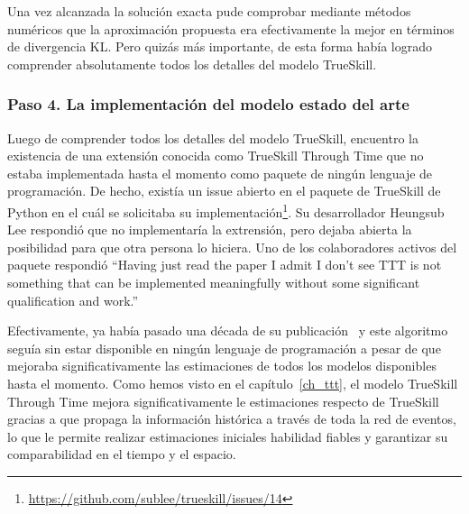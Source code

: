\documentclass[a4paper,11pt]{book}
\theoremstyle{definition}
\begin{document}

Una vez alcanzada la soluci\'on exacta pude comprobar mediante m\'etodos num\'ericos que la aproximaci\'on propuesta era efectivamente la mejor en t\'erminos de divergencia KL.
%
Pero quiz\'as m\'as importante, de esta forma hab\'ia logrado comprender absolutamente todos los detalles del modelo TrueSkill.

\subsubsection{Paso 4. La implementaci\'on del modelo estado del arte}

Luego de comprender todos los detalles del modelo TrueSkill, encuentro la existencia de una extensi\'on conocida como TrueSkill Through Time que no estaba implementada hasta el momento como paquete de ning\'un lenguaje de programaci\'on.
%
De hecho, exist\'ia un issue abierto en el paquete de TrueSkill de Python en el cu\'al se solicitaba su implementaci\'on\footnote{\url{https://github.com/sublee/trueskill/issues/14}}.
%
Su desarrollador Heungsub Lee respondi\'o que no implementar\'ia la extrensi\'on, pero dejaba abierta la posibilidad para que otra persona lo hiciera.
%
Uno de los colaboradores activos del paquete respondi\'o ``Having just read the paper I admit I don't see TTT is not something that can be implemented meaningfully without some significant qualification and work.''


Efectivamente, ya hab\'ia pasado una d\'ecada de su publicaci\'on~\cite{Dangauthier2007} y este algoritmo segu\'ia sin estar disponible en ning\'un lenguaje de programaci\'on a pesar de que mejoraba significativamente las estimaciones de todos los modelos disponibles hasta el momento.
%
Como hemos visto en el cap\'itulo~\ref{ch_ttt}, el modelo TrueSkill Through Time mejora significativamente le estimaciones respecto de TrueSkill gracias a que propaga la informaci\'on hist\'orica a trav\'es de toda la red de eventos, lo que le permite realizar estimaciones iniciales habilidad fiables y garantizar su comparabilidad en el tiempo y el espacio.

\end{document}
